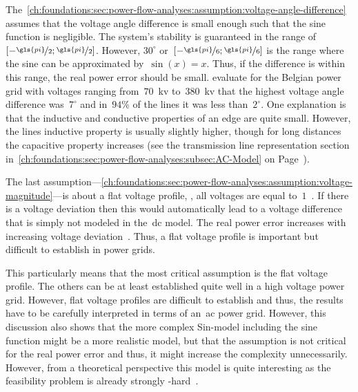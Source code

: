 The~\cref{ch:foundations:sec:power-flow-analyses:assumption:voltage-angle-difference}
assumes that the voltage angle difference is small enough such that the sine
function is negligible. The system's stability is guaranteed in the range of~$
[-\nicefrac{\gls{pi}}{2};\nicefrac{\gls{pi}}{2}]$. However, $30^\circ$ or~$[ -
\nicefrac{\gls{pi}}{6};\nicefrac{\gls{pi}}{6} ]$ is the range where the sine can be
approximated by~$\sin(x) = x$. Thus, if the difference is within this range, the
real power error should be small. \textcite[p.2]{Pur05} evaluate for the Belgian
power grid with voltages ranging from~$70$~\gls{kv} to~$380$~\gls{kv} that the
highest voltage angle difference was~$7^\circ$ and in~$94\%$ of the lines it was
less than~$2^\circ$. One explanation is that the inductive and conductive
properties of an edge are quite small. However, the lines inductive property is
usually slightly higher, though for long distances the capacitive property
increases (see the transmission line representation section
in~\cref{ch:foundations:sec:power-flow-analyses:subsec:AC-Model} on
Page~\pageref{ch:foundations:sec:power-flow-analyses:transmission-line-representation}).

The last
assumption---\cref{ch:foundations:sec:power-flow-analyses:assumption:voltage-magnitude}\!\!---is
about a flat voltage profile, \eg, all voltages are equal to~$1$~.
If there is a voltage deviation then this would automatically lead to a voltage
difference that is simply not modeled in the~\gls{dc} model. The real power
error increases with increasing voltage deviation~\parencite[p.4; Figure
7]{Pur05}. Thus, a flat voltage profile is important but difficult to establish
in power grids.  %

This particularly means that the most critical assumption is the flat voltage
profile. The others can be at least established quite well in a high voltage
power grid. However, flat voltage profiles are difficult to establish and thus,
the results have to be carefully interpreted in terms of an~\gls{ac} power
grid. However, this discussion also shows that the more complex Sin-model
including the sine function might be a more realistic model, but that the
assumption is not critical for the real power error and thus, it might increase
the complexity unnecessarily. However, from a theoretical perspective this
model is quite interesting as the feasibility problem is already strongly
\NP-hard~\textcite{Bie19}.
% 
